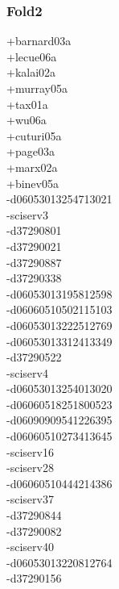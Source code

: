 \begin{multicols}{3}
\subsubsection*{Fold2}
+barnard03a\\
+lecue06a\\
+kalai02a\\
+murray05a\\
+tax01a\\
+wu06a\\
+cuturi05a\\
+page03a\\
+marx02a\\
+binev05a\\
-d06053013254713021\\
-sciserv3\\
-d37290801\\
-d37290021\\
-d37290887\\
-d37290338\\
-d06053013195812598\\
-d06060510502115103\\
-d06053013222512769\\
-d06053013312413349\\
-d37290522\\
-sciserv4\\
-d06053013254013020\\
-d06060518251800523\\
-d06090909541226395\\
-d06060510273413645\\
-sciserv16\\
-sciserv28\\
-d06060510444214386\\
-sciserv37\\
-d37290844\\
-d37290082\\
-sciserv40\\
-d06053013220812764\\
-d37290156\\

\end{multicols}
